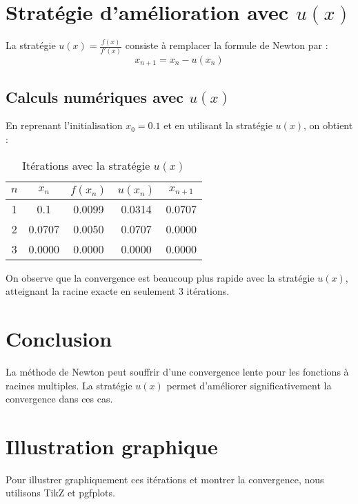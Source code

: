 \documentclass{article}
\begin{document}
\section{Stratégie d'amélioration avec \( u(x) \)}
La stratégie \( u(x) = \frac{f(x)}{f'(x)} \) consiste à remplacer la formule de Newton par :
\[
x_{n+1} = x_n - u(x_n)
\]

\subsection{Calculs numériques avec \( u(x) \)}

En reprenant l'initialisation \( x_0 = 0.1 \) et en utilisant la stratégie \( u(x) \), on obtient :

\begin{table}[h!]
\centering
\begin{tabular}{|c|c|c|c|c|}
\hline
$n$ & $x_n$ & $f(x_n)$ & $u(x_n)$ & $x_{n+1}$ \\
\hline
1 & 0.1 & 0.0099 & 0.0314 & 0.0707 \\
2 & 0.0707 & 0.0050 & 0.0707 & 0.0000 \\
3 & 0.0000 & 0.0000 & 0.0000 & 0.0000 \\
\hline
\end{tabular}
\caption{Itérations avec la stratégie \( u(x) \)}
\end{table}

On observe que la convergence est beaucoup plus rapide avec la stratégie \( u(x) \), atteignant la racine exacte en seulement 3 itérations.

\section{Conclusion}
La méthode de Newton peut souffrir d'une convergence lente pour les fonctions à racines multiples. La stratégie \( u(x) \) permet d'améliorer significativement la convergence dans ces cas.

\section{Illustration graphique}
Pour illustrer graphiquement ces itérations et montrer la convergence, nous utilisons TikZ et pgfplots.
\end{document}
